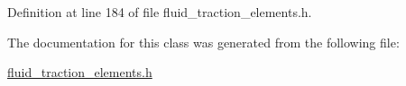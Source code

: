 Definition at line 184 of file fluid\+\_\+traction\+\_\+elements.\+h.



The documentation for this class was generated from the following file\+:\begin{DoxyCompactItemize}
\item 
\hyperlink{fluid__traction__elements_8h}{fluid\+\_\+traction\+\_\+elements.\+h}\end{DoxyCompactItemize}
